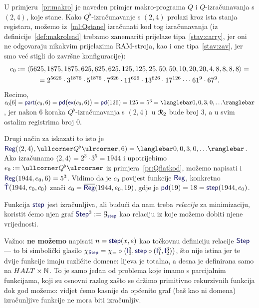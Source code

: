 \begin{primjer}[{name=[{kod $Q^\flat$-izračunavanja s ${(2,4)}$}]}]
U primjeru~\ref{pr:makro} je naveden primjer makro-programa $Q$ i $Q$-izračunavanja s $(2,4)$, koje stane. Kako $Q^\flat$-izračunavanje s $(2,4)$ prolazi kroz ista stanja registara, možemo iz~\eqref{ml:Qstane} izračunati kod tog izračunavanja (iz definicije~\ref{def:makrolead} trebamo zanemariti prijelaze tipa~\ref{stav:carry}, jer oni ne odgovaraju nikakvim prijelazima RAM-stroja, kao i one tipa~\ref{stav:zav}, jer smo već stigli do završne konfiguracije):
\begin{multline}
    c_0:=\langle5625,1875,1875,625,625,625,125,125,25,50,50,10,20,20,4,8,8,8,8\rangle=\\
    =2^{5626}\cdot3^{1876}\cdot5^{1876}\cdot7^{626}\cdot11^{626}\cdot13^{626}\cdot17^{126}\mathbin{\dotsm}61^9\cdot67^9\text.
\end{multline}
Recimo, $c_0[6]=\f{part}(c_0,6)=\f{pd}\bigl(\f{ex}(c_0,6)\bigr)=\f{pd}(126)=125=5^3=\knk{0,0,3,0,\dotsc}$, jer nakon $6$ koraka $Q^\flat$-izračunavanja s $(2,4)$ u $\mathcal R_{2}$ bude broj $3$, a u svim ostalim registrima broj $0$.

Drugi način za iskazati to isto je $\f{Reg}(\langle2,4\rangle,\kprog{Q^\flat},6)=\knk{0,0,3,0,\dotsc}$. Ako iz\-ra\-ču\-na\-mo $\langle2,4\rangle=2^3\cdot3^5=1944$ i upotrijebimo $e_0:=\kprog{Q^\flat}$ iz primjera~\ref{pr:Qflatkod}, možemo napisati i $\f{Reg}(1944,e_0,6)=5^3$. Vidimo da je $c_0$ povijest funkcije $\f{Reg}$, konkretno $\f{\hat T}(1944,e_0,c_0)$ znači $c_0=\overline{\f{Reg}}(1944,e_0,19)$, gdje je $\f{pd}(19)=18=\f{step}(1944,e_0)$.
\end{primjer}


Funkcija $\f{step}$ jest izračunljiva, ali budući da nam treba \emph{relacija} za minimizaciju, koristit ćemo njen graf $\f{Step}^3:=\graf{\f{step}}$ kao relaciju iz koje možemo dobiti njene vrijednosti. 

\begin{napomena}[{name=[problemi s parcijalnom jednakošću]}]\label{nap:parc=}
Važno: \textbf{ne možemo} napisati $n=\f{step}(x,e)$ kao točkovnu definiciju relacije $\f{Step}$ --- to bi simbolički glasilo $\chi_{\f{Step}}=\chi_=\circ\bigl(\f I_3^3,\f{step}\circ(\f I_1^3,\f I_2^3)\bigr)$, što nije istina jer te dvije funkcije imaju različite domene: lijeva je totalna, a desna je definirana samo na $HALT\times{\mathbb N}$. To je samo jedan od problema koje imamo s parcijalnim funkcijama, koji su osnovni razlog zašto se držimo primitivno rekurzivnih funkcija dok god možemo: vidjet ćemo kasnije da općenito graf (baš kao ni domena) izračunljive funkcije ne mora biti izračunljiv.
\end{napomena}

